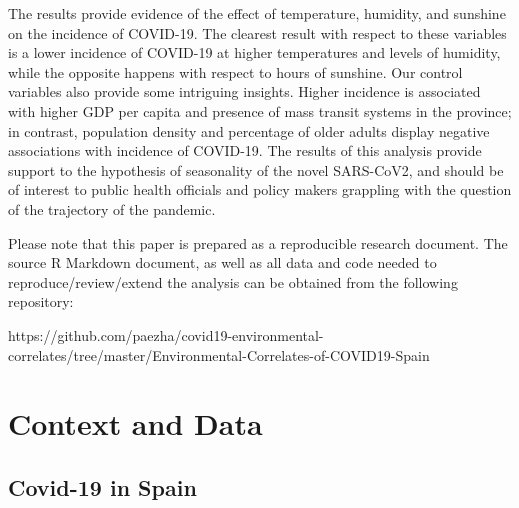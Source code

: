 \documentclass[]{elsarticle} %
\begin{document}
The results provide evidence of the effect of temperature, humidity, and
sunshine on the incidence of COVID-19. The clearest result with respect
to these variables is a lower incidence of COVID-19 at higher
temperatures and levels of humidity, while the opposite happens with
respect to hours of sunshine. Our control variables also provide some
intriguing insights. Higher incidence is associated with higher GDP per
capita and presence of mass transit systems in the province; in
contrast, population density and percentage of older adults display
negative associations with incidence of COVID-19. The results of this
analysis provide support to the hypothesis of seasonality of the novel
SARS-CoV2, and should be of interest to public health officials and
policy makers grappling with the question of the trajectory of the
pandemic.

Please note that this paper is prepared as a reproducible research
document. The source R Markdown document, as well as all data and code
needed to reproduce/review/extend the analysis can be obtained from the
following repository:

https://github.com/paezha/covid19-environmental-correlates/tree/master/Environmental-Correlates-of-COVID19-Spain

\hypertarget{context-and-data}{%
\section{Context and Data}\label{context-and-data}}

\hypertarget{covid-19-in-spain}{%
\subsection{Covid-19 in Spain}\label{covid-19-in-spain}}
\end{document}
